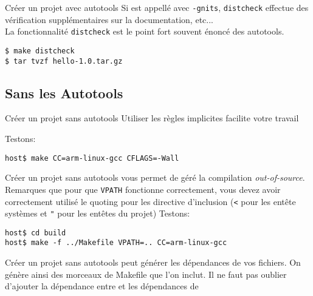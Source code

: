 \begin{frame}[fragile=singleslide]{Créer un projet avec autotools}
  Si   est appellé avec  \verb+-gnits+, \verb+distcheck+
  effectue des vérification supplémentaires sur la documentation,
  etc...
  \\[2ex]
  La fonctionnalité \verb+distcheck+ est  le point fort souvent énoncé
  des autotools.
\begin{lstlisting}
$ make distcheck
$ tar tvzf hello-1.0.tar.gz
\end{lstlisting} %
\end{frame}

\subsection{Sans les Autotools}

\begin{frame}[fragile=singleslide]{Créer un projet sans autotools}
  Utiliser les règles implicites facilite votre travail
  
  Testons:
\begin{lstlisting}
host$ make CC=arm-linux-gcc CFLAGS=-Wall
\end{lstlisting} %
\end{frame}

\begin{frame}[fragile=singleslide]{Créer un projet sans autotools}
   vous permet de géré la compilation \emph{out-of-source}.
  Remarques que pour que \verb+VPATH+ fonctionne correctement, vous devez avoir
  correctement utilisé le quoting pour les directive d'inclusion (\verb+<+ pour
  les entête systèmes et \verb+"+ pour les entêtes du projet)
  Testons: 
\begin{lstlisting}
host$ cd build
host$ make -f ../Makefile VPATH=.. CC=arm-linux-gcc
\end{lstlisting} %
\end{frame}

\begin{frame}[fragile=singleslide]{Créer un projet sans autotools}
   peut  générer les dépendances de vos  fichiers.  On génère
  ainsi  des morceaux  de Makefile  que l'on  inclut. Il  ne  faut pas
  oublier   d'ajouter  la  dépendance   entre     et  les
  dépendances de 
  
\end{frame}

